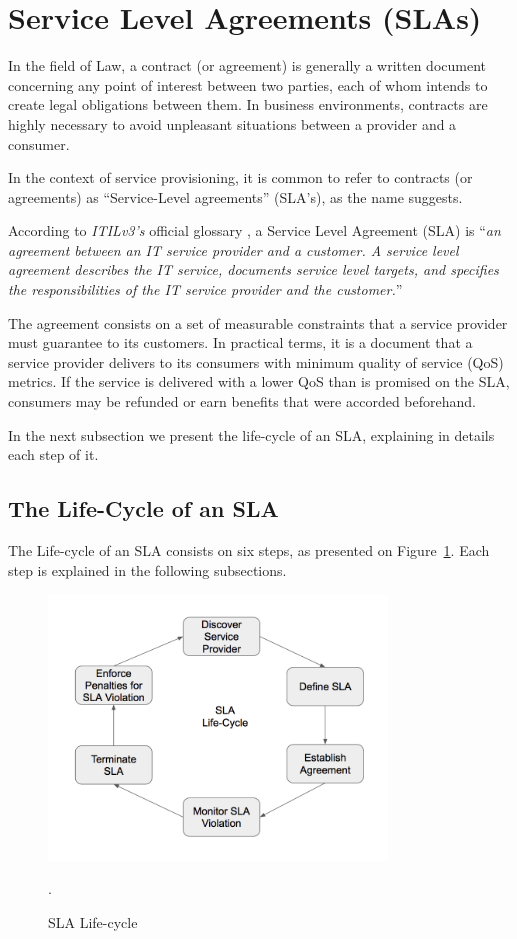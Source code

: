 \section{Service Level Agreements (SLAs)}

In the field of Law, a contract (or agreement) is generally a written document concerning any point of interest between two parties, each of whom intends to create legal obligations between them. In business environments, contracts are highly necessary to avoid unpleasant situations between a provider and a consumer. 

In the context of service provisioning, it is common to refer to contracts (or agreements) as ``Service-Level agreements'' (SLA's), as the name suggests.  

According to \textit{ITILv3's} official glossary \cite{itilv3glossary}, a Service Level Agreement (SLA) is ``\textit{an agreement between an IT service provider and a customer. 
A service level agreement describes the IT service, documents service level targets, and specifies the responsibilities of the IT service provider and the customer.}'' 

The agreement consists on a set of measurable constraints that a service provider must guarantee to its customers.
In practical terms, it is a document that a service provider delivers to its consumers with minimum quality of service (QoS) metrics. 
If the service is delivered with a lower QoS than is promised on the SLA, consumers may be refunded or earn benefits that were accorded beforehand. 

In the next subsection we present the life-cycle of an SLA, explaining in details each step of it. 

\subsection{The Life-Cycle of an SLA}

The Life-cycle of an SLA consists on six steps, as presented on Figure~\ref{fig:sla-lifecycle}. Each step is explained in the following subsections. 

\begin{figure}[ht!]
\centering
\includegraphics[width=90mm]{Imagens/sla-lifecycle.png}
\caption{SLA Life-cycle \cite{wu2012service}}.\label{fig:sla-lifecycle}
\end{figure}

